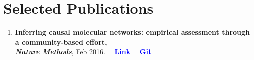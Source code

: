 \documentclass[letter]{res}
\begin{document}
\begin{resume}
\begin{itemize}[leftmargin=-.1in]
			
		\end{itemize}
		
		
		\section{Selected Publications}
		\begin{enumerate}[leftmargin=-.01in]
			\item \textbf{Inferring causal molecular networks: empirical assessment through a community-based effort,}\\ \textbf{\textit{Nature Methods}}, Feb 2016.
 			~~\href{http://www.nature.com/nmeth/journal/vaop/ncurrent/full/nmeth.3773.html}{\textbf{\textcolor{blue}{Link}}}
			~~\href{https://github.com/omid55/nature_causal_network}{\textbf{\textcolor{blue}{Git}}}
			

\end{enumerate}
\end{resume}
\end{document}
